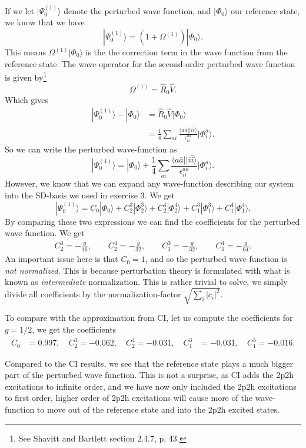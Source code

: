 \documentclass[a4paper, 11pt, notitlepage, english]{article}
\newcommand{\ket}[1]{|#1 \rangle}
\newcommand{\brakket}[2]{\langle #1 || #2 \rangle}
\newcommand{\op}[1]{\hat{#1}}
\newcommand{\eps}{\epsilon}
\begin{document}
If we let $\ket{\Psi^{(1)}_0}$ denote the perturbed wave function, and $\ket{\Phi_0}$ our reference state, we know that we have
$$\ket{\Psi^{(1)}_0} = (1 + \Omega^{(1)})\ket{\Phi_0}.$$
This means $\Omega^{(1)}\ket{\Phi_0}$ is the the correction term in the wave function from the reference state. The wave-operator for the second-order perturbed wave function is given by\footnote{See Shavitt and Bartlett section 2.4.7, p. 43.}
$$\Omega^{(1)} = \op{R}_0 \op{V}.$$
Which gives
\begin{align*}
\ket{\Psi^{(1)}_0} - \ket{\Phi_0} &= \op{R}_0 \op{V}\ket{\Phi_0} \\
&= \frac{1}{4}\sum_{ai} \frac{\brakket{a\bar{a}}{i\bar{i}}}{\eps_{ii}^{aa}}\ket{\Phi_{i}^{a}}.
\end{align*}
So we can write the perturbed wave-function as
$$\ket{\Psi^{(1)}_0} = \ket{\Phi_0} + \frac{1}{4}\sum_{ai} \frac{\brakket{a\bar{a}}{i\bar{i}}}{\eps_{ii}^{aa}}\ket{\Phi_{i}^{a}}.$$
However, we know that we can expand any wave-function describing our system into the SD-basis we used in exercise 3. We get
$$\ket{\Psi^{(1)}_0} = C_0\ket{\Phi_0} + C_2^3\ket{\Phi_2^3} + C_2^4\ket{\Phi_2^4} + C_1^3\ket{\Phi_1^3} + C_1^4\ket{\Phi_1^4}.$$
By comparing these two expressions we can find the coefficients for the perturbed wave function. We get
\begin{align*}
C_2^3 = -\frac{g}{16}, \qquad C_2^4 = -\frac{g}{32}, \qquad C_1^3 = -\frac{g}{32}, \qquad C_1^4 = -\frac{g}{64}.
\end{align*}
An important issue here is that $C_0 = 1$, and so the perturbed wave function is \emph{not normalized}. This is because perturbation theory is formulated with what is known as \emph{intermediate} normalization. This is rather trivial to solve, we simply divide all coefficients by the normalization-factor $\sqrt{\sum_i |c_i|^2}$.

To compare with the approximation from CI, let us compute the coefficients for $g=1/2$, we get the coefficients
\begin{align*}
C_0 &= 0.997, \quad C_2^3 = -0.062,  \quad C_2^4 = -0.031, \quad C_1^3 &= -0.031, \quad C_1^5 = -0.016.
\end{align*}

Compared to the CI results, we see that the reference state plays a much bigger part of the perturbed wave function. This is not a surprise, as CI adds the 2p2h excitations to infinite order, and we have now only included the 2p2h excitations to first order, higher order of 2p2h excitations will cause more of the wave-function to move out of the reference state and into the 2p2h excited states.
\end{document}
